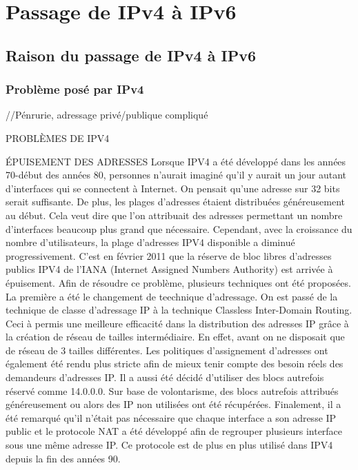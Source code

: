 \section{Passage de IPv4 à IPv6}
\subsection{Raison du passage de IPv4 à IPv6}
\subsubsection{Problème posé par IPv4}
//Pénrurie, adressage privé/publique compliqué

PROBLÈMES DE IPV4

ÉPUISEMENT DES ADRESSES
Lorsque IPV4 a été développé dans les années 70-début des années 80, personnes n'aurait imaginé qu'il y aurait un jour autant d'interfaces qui se connectent à Internet. On pensait qu'une adresse sur 32 bits serait suffisante. De plus, les plages d'adresses étaient distribuées généreusement au début. Cela veut dire que l'on attribuait des adresses permettant un nombre d'interfaces beaucoup plus grand que nécessaire.
Cependant, avec la croissance du nombre d'utilisateurs, la plage d'adresses IPV4 disponible a diminué progressivement. C'est en février 2011 que la réserve de bloc libres d'adresses publics IPV4 de l'IANA (Internet Assigned Numbers Authority) est arrivée à épuisement.
Afin de résoudre ce problème, plusieurs techniques ont été proposées.
La première a été le changement de teechnique d'adressage. On est passé de la technique de classe d'adressage IP à la technique Classless Inter-Domain Routing. Ceci à permis une meilleure efficacité dans la distribution des adresses IP grâce à la création de réseau de tailles intermédiaire. En effet, avant on ne disposait que de réseau de 3 tailles différentes.
Les politiques d'assignement d'adresses ont également été rendu plus stricte afin de mieux tenir compte des besoin réels des demandeurs d'adresses IP.
Il a aussi été décidé d'utiliser des blocs autrefois réservé comme 14.0.0.0.
Sur base de volontarisme, des blocs autrefois attribués généreusement ou alors des IP non utilisées ont été récupérées. 
Finalement, il a été remarqué qu'il n'était pas nécessaire que chaque interface a son adresse IP public et le protocole NAT a été développé afin de regrouper plusieurs interface sous une même adresse IP. Ce protocole est de plus en plus utilisé dans IPV4 depuis la fin des années 90.

